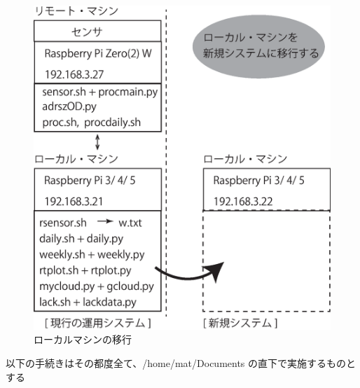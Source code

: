 \documentclass[12pt,a4paper,uplatex]{jsbook}
\begin{document}
\begin{figure}[htbp]
	\begin{minipage}[b]{1.0\linewidth}
		\centering
		\includegraphics[keepaspectratio, scale=0.4]{figs/eps/ikou.eps}
		\caption{ローカルマシンの移行}
	\end{minipage}
\end{figure}

以下の手続きはその都度全て、/home/mat/Documents の直下で実施するものとする
\end{document}
